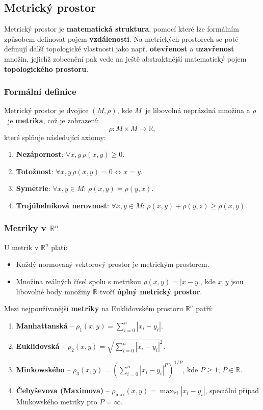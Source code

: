 \subsection{Metrický prostor}
Metrický prostor je \textbf{matematická struktura}, pomocí které lze formálním způsobem definovat pojem \textbf{vzdálenosti}. Na metrických prostorech se poté definují další topologické vlastnosti jako např. \textbf{otevřenost} a \textbf{uzavřenost} množin, jejichž zobecnění pak vede na ještě abstraktnější matematický pojem \textbf{topologického prostoru}.

\subsubsection{Formální definice}
Metrický prostor je dvojice $(M, \rho)$, kde $M$ je libovolná neprázdná množina a $\rho$ je \textbf{metrika}, což je zobrazení:
\begin{equation*}
\rho: M \times M \rightarrow \mathbb{R},
\end{equation*}
které splňuje následující axiomy:
\begin{enumerate}
\item \textbf{Nezápornost}: $\forall x, y \, \rho(x, y) \geq 0$.
\item \textbf{Totožnost}: $\forall x, y \, \rho (x, y)  = 0 \Leftrightarrow x = y$.
\item \textbf{Symetrie}: $\forall x, y \in M: \, \rho(x, y) = \rho(y,x)$.
\item \textbf{Trojúhelníková nerovnost}: $\forall x, y \in M: \, \rho(x, y) + \rho(y,z) \geq \rho(x, y)$.
\end{enumerate}

\subsubsection{Metriky v $\mathbb{R}^n$}
U metrik v $\mathbb{R}^n$ platí:
\begin{itemize}
\item Každý normovaný vektorový prostor je metrickým prostorem.
\item Množina reálných čísel spolu s metrikou $\rho(x, y) = |x - y|$, kde $x, y$ jsou libovolné body množiny $\mathbb{R}$ tvoří \textbf{úplný metrický prostor}.
\end{itemize}
Mezi nejpoužívanější \textbf{metriky} na Euklidovském prostoru $\mathbb{R}^n$ patří:
\begin{enumerate}
\item \textbf{Manhattanská} -- $\rho_1(x, y) = \sum_{i = 0}^n |x_i - y_i|$.
\item \textbf{Euklidovská} -- $\rho_2(x, y) = \sqrt{\sum_{i = 0}^n |x_i - y_i|^2}$.
\item \textbf{Minkowského} -- $\rho_3(x, y) = (\sum_{i = 0}^n |x_i - y_i|^P)^{1/P}$, kde $P \geq 1; \, P \in \mathbb{R}$.
\item \textbf{Čebyševova (Maximova)} -- $\rho_{\max}(x, y) = \max_{\forall i} |x_i - y_i|$, speciální případ Minkowského metriky pro $P = \infty$.
\end{enumerate}

